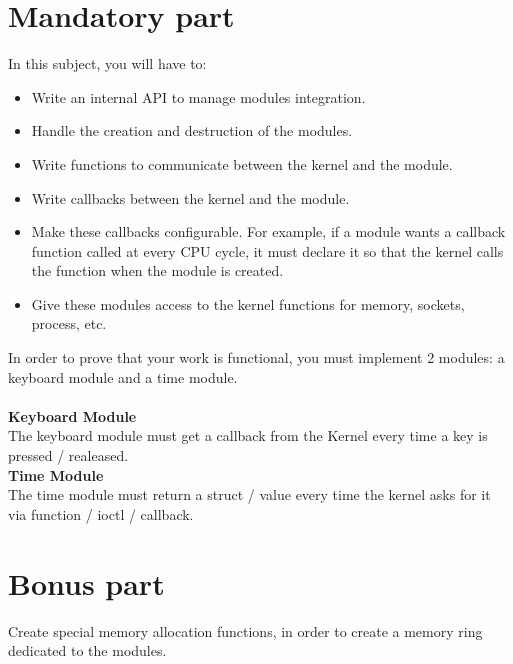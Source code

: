 \documentclass{42-en}
\begin{document}
\chapter{Mandatory part}
    In this subject, you will have to:
    \begin{itemize}\itemsep1pt
        \item Write an internal API to manage modules integration.
        \item Handle the creation and destruction of the modules.
        \item Write functions to communicate between the kernel and the module.
        \item Write callbacks between the kernel and the module.
        \item Make these callbacks configurable. For example, if a module wants
        a callback function called at every CPU cycle, it must declare it so
        that the kernel calls the function when the module is created.
        \item Give these modules access to the kernel functions for memory,
        sockets, process, etc.
    \end{itemize}
    In order to prove that your work is functional, you must implement 2
    modules: a keyboard module and a time module.\\
    \\
    \textbf{Keyboard Module}\\
    The keyboard module must get a callback from the Kernel every time a
    key is pressed / realeased.\\
    \textbf{Time Module}\\
    The time module must return a struct / value every time the kernel asks for
    it via function / ioctl / callback.

\chapter{Bonus part}
    Create special memory allocation functions, in order to create a memory
    ring dedicated to the modules.
\end{document}
